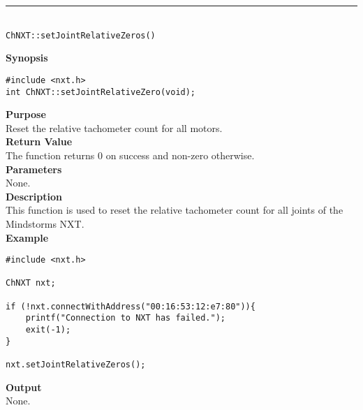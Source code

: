 \noindent
\vspace{5pt}
\rule{4.5in}{0.015in}\\
\noindent
{\LARGE \texttt{ChNXT::setJointRelativeZeros()} }\\


\noindent
{\bf Synopsis}
\begin{lstlisting}
#include <nxt.h>
int ChNXT::setJointRelativeZero(void);
\end{lstlisting}

\noindent
{\bf Purpose}\\
Reset the relative tachometer count for all motors.\\

\noindent
{\bf Return Value}\\
The function returns 0 on success and non-zero otherwise.\\

\noindent
{\bf Parameters}\\
None.\\

\noindent
{\bf Description}\\
This function is used to reset the relative tachometer count for 
all joints of the Mindstorms NXT.\\

\noindent
{\bf Example}
\begin{lstlisting}
#include <nxt.h> 

ChNXT nxt;

if (!nxt.connectWithAddress("00:16:53:12:e7:80")){
    printf("Connection to NXT has failed.");
    exit(-1);
}
    
nxt.setJointRelativeZeros();
\end{lstlisting}

\noindent
{\bf Output}\\
None.\\
\\
